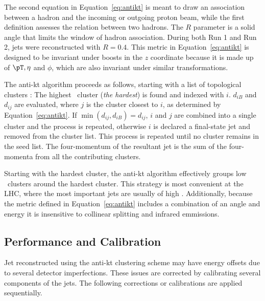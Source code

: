 The second equation in Equation~\ref{eq:antikt} is meant to draw an association between 
a hadron and the incoming or outgoing proton beam, while the first definition assesses the relation 
between two hadrons. The $R$ parameter is a solid angle that limits  
the window of hadron association. During both Run 1 and Run 2, jets were reconstructed with $R=0.4$.
 This metric in Equation~\ref{eq:antikt} is designed to be invariant under boosts in the $z$ 
coordinate because it is made up of $\pT, \eta$ and $\phi$, which are also invariant under similar transformations. 

\par The anti-kt algorithm proceeds as follows, starting with a list of topological clusters :
 The highest \pT\ cluster ({\it the hardest})
is found and indexed with $i$. $d_{iB}$ and $d_{ij}$ are evaluated, where $j$ is the cluster closest 
to $i$, as determined by Equation~\ref{eq:antikt}. If $\min(d_{ij},d_{iB}) = d_{ij}$, $i$ and 
$j$ are combined into a single cluster and the process is repeated, otherwise $i$ is declared 
a final-state jet and removed from the cluster list. This process is repeated until no cluster remains in 
the seed list. The four-momentum of the resultant jet is the sum of the four-momenta from all 
the contributing clusters. 

\par Starting with the hardest cluster, the anti-kt algorithm effectively groups low \pt\ 
clusters around the hardest cluster. This strategy is most convenient at the LHC, where the most important 
jets are usually of high \pt. Additionally, because the metric defined in Equation~\ref{eq:antikt}
includes a combination of an angle and energy it is insensitive to collinear splitting and infrared 
emmissions.  

\subsection{Performance and Calibration}
\label{sec:jetCalib}
\par Jet reconstructed using the anti-kt clustering scheme may have energy offsets due to several 
detector imperfections. These issues are corrected by calibrating several components of the jets. 
The following corrections or calibrations are applied sequentially.

